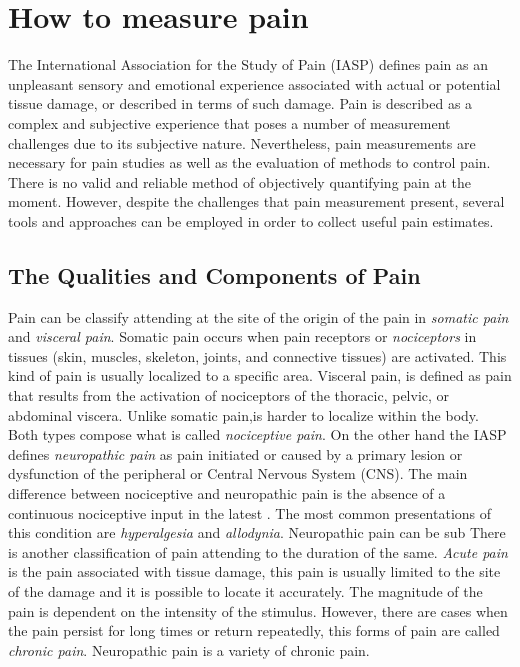 \section{How to measure pain}
The International Association for the Study of Pain (IASP) defines pain as an unpleasant sensory and emotional experience associated with actual or potential tissue damage, or described in terms of such damage\cite{(Marsky and Bogduk, 1994}. Pain is described as a complex and subjective experience that poses a number of measurement challenges due to its subjective nature. Nevertheless, pain measurements are necessary for pain studies as well as the evaluation of methods to control pain.\cite{libro pain}
There is no valid and reliable method of objectively quantifying pain at the moment. However, despite the challenges that pain measurement present, several tools and approaches can be employed in order to collect useful pain estimates. \cite{pain outcomes paper} 


 \subsection{The Qualities and Components of Pain}
 Pain can be classify attending at the site of the origin of the pain in \textit{somatic pain} and \textit{visceral pain}. Somatic pain occurs when pain receptors or \textit{nociceptors} in tissues (skin, muscles, skeleton, joints, and connective tissues) are activated. This kind of pain is usually localized to a specific area. Visceral pain, is defined as pain that results from the activation of nociceptors of the thoracic, pelvic, or abdominal viscera. Unlike somatic pain,is harder to localize within the body. Both types compose what is called \textit{nociceptive pain}. On the other hand the IASP defines \textit{neuropathic pain} as pain initiated or caused by a primary lesion or dysfunction of the peripheral or Central Nervous System (CNS). The main difference between nociceptive and neuropathic pain is the absence of a continuous nociceptive input in the latest \cite{neuropathic pain}. The most common presentations of this condition are \textit{hyperalgesia}  and \textit{allodynia}. Neuropathic pain can be sub
There is another classification of pain attending to the duration of the same. \textit{Acute pain} is the pain associated with tissue damage, this pain is usually limited to the site of the damage and it is possible to locate it accurately. The magnitude of the pain is dependent on the intensity of the stimulus. However, there are cases when the pain persist for long times or return repeatedly, this forms of pain are called \textit{chronic pain}. Neuropathic pain is a variety of chronic pain.

